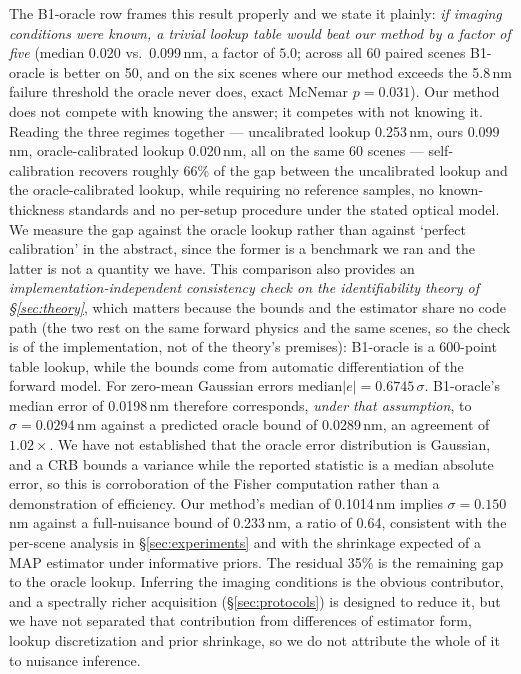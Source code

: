 \documentclass[10pt]{article}
\begin{document}
The B1-oracle row frames this result properly and we state it plainly: \emph{if imaging conditions were known, a trivial lookup table would beat our method by a factor of five} (median 0.020 vs.\ 0.099\,nm, a factor of $5.0$; across all 60 paired scenes B1-oracle is better on 50, and on the six scenes where our method exceeds the 5.8\,nm failure threshold the oracle never does, exact McNemar $p{=}0.031$). Our method does not compete with knowing the answer; it competes with not knowing it. Reading the three regimes together --- uncalibrated lookup 0.253\,nm, ours 0.099\,nm, oracle-calibrated lookup 0.020\,nm, all on the same 60 scenes --- self-calibration recovers roughly 66\% of the gap between the uncalibrated lookup and the oracle-calibrated lookup, while requiring no reference samples, no known-thickness standards and no per-setup procedure under the stated optical model. We measure the gap against the oracle lookup rather than against `perfect calibration' in the abstract, since the former is a benchmark we ran and the latter is not a quantity we have. This comparison also provides an \emph{implementation-independent consistency check on the identifiability theory of \S\ref{sec:theory}}, which matters because the bounds and the estimator share no code path (the two rest on the same forward physics and the same scenes, so the check is of the implementation, not of the theory's premises): B1-oracle is a 600-point table lookup, while the bounds come from automatic differentiation of the forward model. For zero-mean Gaussian errors $\mathrm{median}|e|=0.6745\,\sigma$. B1-oracle's median error of 0.0198\,nm therefore corresponds, \emph{under that assumption}, to $\sigma=0.0294$\,nm against a predicted oracle bound of 0.0289\,nm, an agreement of $1.02\times$. We have not established that the oracle error distribution is Gaussian, and a CRB bounds a variance while the reported statistic is a median absolute error, so this is corroboration of the Fisher computation rather than a demonstration of efficiency. Our method's median of 0.1014\,nm implies $\sigma=0.150$\,nm against a full-nuisance bound of 0.233\,nm, a ratio of 0.64, consistent with the per-scene analysis in \S\ref{sec:experiments} and with the shrinkage expected of a MAP estimator under informative priors. The residual 35\% is the remaining gap to the oracle lookup. Inferring the imaging conditions is the obvious contributor, and a spectrally richer acquisition (\S\ref{sec:protocols}) is designed to reduce it, but we have not separated that contribution from differences of estimator form, lookup discretization and prior shrinkage, so we do not attribute the whole of it to nuisance inference.
\end{document}
